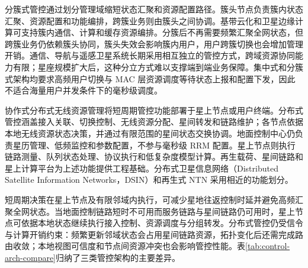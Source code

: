 分簇式管控通过划分管理域缩短状态汇聚和资源配置路径。簇头节点负责簇内状态汇聚、资源配置和功能编排，跨簇业务则由簇头之间协调。基带云化和卫星边缘计算可支持簇内通信、计算和缓存资源编排\cite{wang-cloudnativeSat-EDGE23,wang-cloudCellfree-comMag20,wang-SatComputing-IoTJ2-23}。分簇后不再需要频繁汇聚全网状态，但跨簇业务仍依赖簇头协同，簇头失效会影响簇内用户，用户跨簇切换也会增加管理开销。通信、导航与遥感卫星系统长期采用相互独立的管控方式，跨域资源协同能力有限\cite{liu-spaceAirGround-ComSurveys2018}；星座规模扩大后，这种分立方式难以支撑端到端业务保障\cite{kodhe-comNewEra-tutorials2021,di-5Goffloading-press2019}。集中式和分簇式架构均要求高频用户切换与 MAC 层资源调度等待状态上报和配置下发，因此不适合海量用户并发条件下的毫秒级调度。

协作式分布式无线资源管理将短周期管控功能部署于星上节点或用户终端。分布式管控涵盖接入关联、切换控制、无线资源分配、星间转发和链路维护；各节点依据本地无线资源状态决策，并通过有限范围的星间状态交换协调。地面控制中心仍负责星历管理、低频监控和参数配置，不参与毫秒级 RRM 配置。星上节点则执行链路测量、队列状态处理、协议执行和低复杂度模型计算。再生载荷、星间链路和星上计算平台为上述功能提供工程基础\cite{fang-6GSatCompute-SpaceElec2023,zou-SatComSurvey-SpaceElec2023,zhang-distributedSat-SCIS2025,Mahboob-AIEmpoweredNTN-Survey-COMST24}。分布式卫星信息网络（Distributed Satellite Information Networks，DSIN）和再生式 NTN 采用相近的功能划分。

短周期决策在星上节点及有限邻域内执行，可减少星地往返控制时延并避免高频汇聚全网状态。当地面控制链路短时不可用而服务链路与星间链路仍可用时，星上节点可依据本地状态继续执行接入控制、资源调度与分组转发。分布式管控仍受信令与计算开销约束：频繁更新邻域状态会占用星间链路资源，拓扑变化后还需完成路由收敛；本地视图可信度和节点间资源冲突也会影响管控性能。表\ref{tab:control-arch-compare}归纳了三类管控架构的主要差异。

